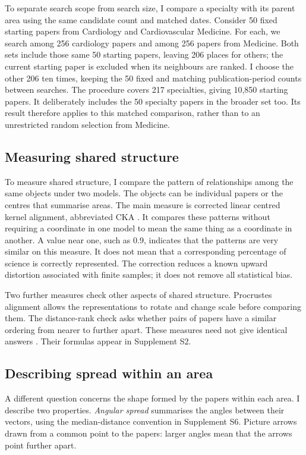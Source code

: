 \documentclass[12pt]{article}
\begin{document}
To separate search scope from search size, I compare a specialty with its parent area using the same candidate count and matched dates. Consider 50 fixed starting papers from Cardiology and Cardiovascular Medicine. For each, we search among 256 cardiology papers and among 256 papers from Medicine. Both sets include those same 50 starting papers, leaving 206 places for others; the current starting paper is excluded when its neighbours are ranked. I choose the other 206 ten times, keeping the 50 fixed and matching publication-period counts between searches. The procedure covers 217 specialties, giving 10,850 starting papers. It deliberately includes the 50 specialty papers in the broader set too. Its result therefore applies to this matched comparison, rather than to an unrestricted random selection from Medicine.

\subsection{Measuring shared structure}
To measure shared structure, I compare the pattern of relationships among the same objects under two models. The objects can be individual papers or the centres that summarise areas. The main measure is corrected linear centred kernel alignment, abbreviated CKA \citep{pmlr-v97-kornblith19a,refa961d84a4e}. It compares these patterns without requiring a coordinate in one model to mean the same thing as a coordinate in another. A value near one, such as 0.9, indicates that the patterns are very similar on this measure. It does not mean that a corresponding percentage of science is correctly represented. The correction reduces a known upward distortion associated with finite samples; it does not remove all statistical bias.

Two further measures check other aspects of shared structure. Procrustes alignment allows the representations to rotate and change scale before comparing them. The distance-rank check asks whether pairs of papers have a similar ordering from nearer to further apart. These measures need not give identical answers \citep{NEURIPS2021_252a3dba,pmlr-v285-williams24a}. Their formulas appear in Supplement S2.

\subsection{Describing spread within an area}
A different question concerns the shape formed by the papers within each area. I describe two properties. \emph{Angular spread} summarises the angles between their vectors, using the median-distance convention in Supplement S6. Picture arrows drawn from a common point to the papers: larger angles mean that the arrows point further apart.
\end{document}
